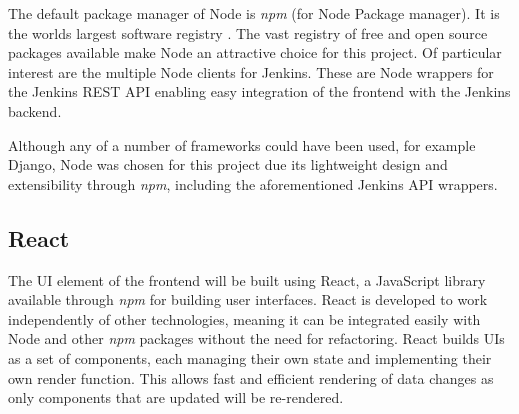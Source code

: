 The default package manager of Node is \textit{npm} (for Node Package manager). It is the worlds largest software registry \citep{npm}. The vast registry of free and open source packages available make Node an attractive choice for this project. Of particular interest are the multiple Node clients for Jenkins. These are Node wrappers for the Jenkins REST API enabling easy integration of the frontend with the Jenkins backend.

Although any of a number of frameworks could have been used, for example Django, Node was chosen for this project due its lightweight design and extensibility through \textit{npm}, including the aforementioned Jenkins API wrappers.
 
\subsection{React}
The UI element of the frontend will be built using React, a JavaScript library available through \textit{npm} for building user interfaces. React is developed to work independently of other technologies, meaning it can be integrated easily with Node and other \textit{npm} packages without the need for refactoring. React builds UIs as a set of components, each managing their own state and implementing their own render function. This allows fast and efficient rendering of data changes as only components that are updated will be re-rendered.


